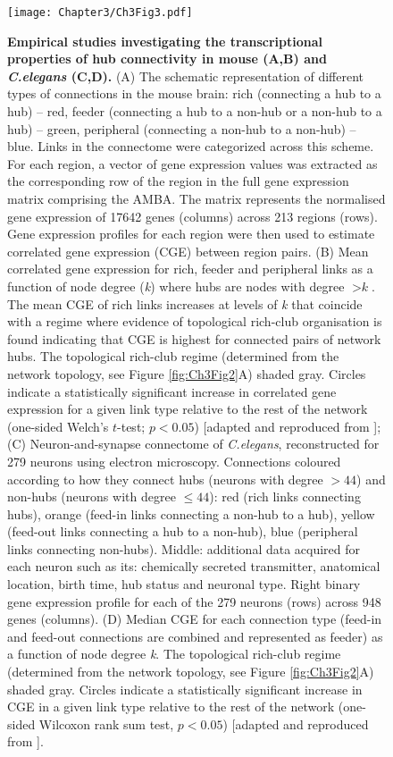 \begin{figure}[!h]
\begin{center}
\texttt{[image: Chapter3/Ch3Fig3.pdf]}%
\end{center}
\caption{\textbf{Empirical studies investigating the transcriptional properties of hub connectivity in mouse (A,B) and \textit{C.elegans} (C,D).}
(A) The schematic representation of different types of connections in the mouse brain: rich (connecting a hub to a hub) -- red, feeder (connecting a hub to a non-hub or a non-hub to a hub) -- green, peripheral (connecting a non-hub to a non-hub) -- blue. Links in the connectome were categorized across this scheme. For each region, a vector of gene expression values was extracted as the corresponding row of the region in the full gene expression matrix comprising the AMBA. The matrix represents the normalised gene expression of \num{17642} genes (columns) across 213 regions (rows). Gene expression profiles for each region were then used to estimate correlated gene expression (CGE) between region pairs.
(B) Mean correlated gene expression for rich, feeder and peripheral links as a function of node degree (\textit{k}) where hubs are nodes with degree $> \textit{k}$. The mean CGE of rich links increases at levels of \textit{k} that coincide with a regime where evidence of topological rich-club organisation is found indicating that CGE is highest for connected pairs of network hubs. The topological rich-club regime (determined from the network topology, see Figure \ref{fig:Ch3Fig2}A) shaded gray. Circles indicate a statistically significant increase in correlated gene expression for a given link type relative to the rest of the network (one-sided Welch's $t$-test; $p < 0.05$) [adapted and reproduced from \citet{Fulcher2016}];
(C) Neuron-and-synapse connectome of \textit{C.elegans}, reconstructed for 279 neurons using electron microscopy. Connections coloured according to how they connect hubs (neurons with degree $> 44$) and non-hubs (neurons with degree $≤ 44$): red (rich links connecting hubs), orange (feed-in links connecting a non-hub to a hub), yellow (feed-out links connecting a hub to a non-hub), blue (peripheral links connecting non-hubs). Middle: additional data acquired for each neuron such as its: chemically secreted transmitter, anatomical location, birth time, hub status and neuronal type. Right binary gene expression profile for each of the 279 neurons (rows) across 948 genes (columns).
(D) Median CGE for each connection type (feed-in and feed-out connections are combined and represented as feeder) as a function of node degree \textit{k}. The topological rich-club regime (determined from the network topology, see Figure \ref{fig:Ch3Fig2}A) shaded gray.
Circles indicate a statistically significant increase in CGE in a given link type relative to the rest of the network (one-sided Wilcoxon rank sum test, $p < 0.05$) [adapted and reproduced from \citet{Arnatkeviciute2018}]. } \label{fig:Ch3Fig3}
\end{figure}


